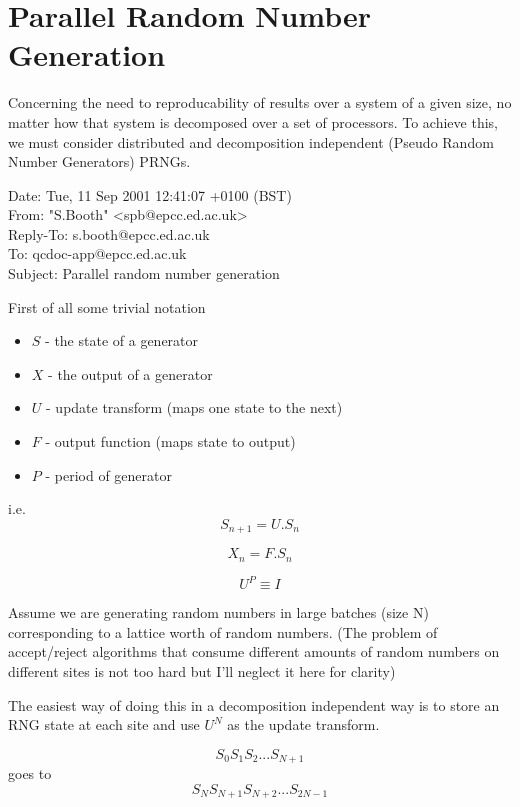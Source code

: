 \documentclass[12pt]{article}
\begin{document}
\section{Parallel Random Number Generation}
Concerning the need to reproducability of results over a system of a given
size, no matter how that system is decomposed over a set of processors.
To achieve this, we must consider distributed and decomposition independent 
(Pseudo Random Number Generators) PRNGs.

Date: Tue, 11 Sep 2001 12:41:07 +0100 (BST)\\
From: "S.Booth" <spb@epcc.ed.ac.uk>\\
Reply-To: s.booth@epcc.ed.ac.uk\\
To: qcdoc-app@epcc.ed.ac.uk\\
Subject: Parallel random number generation

First of all some trivial notation
\begin{itemize}
 \item{$S$} - the state of a generator
 \item{$X$} - the output of a generator
 \item{$U$} - update transform (maps one state to the next)
 \item{$F$} - output function (maps state to output)
 \item{$P$} - period of generator
\end{itemize}
i.e.
\begin{equation}
 S_{n+1} = U.S_{n}
\end{equation}

\begin{equation}
 X_{n} = F.S_{n}
\end{equation}

\begin{equation}
  U^{P} \equiv I
\end{equation}


Assume we are generating random numbers in large batches (size N)
corresponding to a lattice worth of random numbers. (The
problem of accept/reject algorithms that consume different amounts of
random numbers on different sites is not too hard but I'll neglect it
here for clarity)

The easiest way of doing this in a decomposition independent way is to
store an RNG state at each site and use $U^N$ as the update transform.

\begin{equation}
 S_0   S_1   S_2  . . .     S_{N+1}
\end{equation}
goes to
\begin{equation}
 S_N   S_{N+1}   S_{N+2}  . . .     S_{2N-1}
\end{equation}
\end{document}
